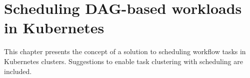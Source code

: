 \thispagestyle{only-cfoot}
\section{Scheduling DAG-based workloads in Kubernetes}\label{s:SchedHyperflow}


This chapter presents the concept of a solution to scheduling workflow tasks in Kubernetes clusters.
Suggestions to enable task clustering with scheduling are included.






